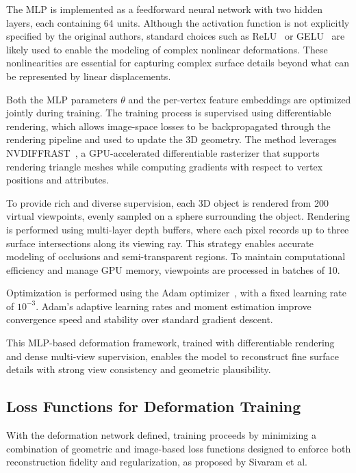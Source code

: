 The MLP is implemented as a feedforward neural network with two hidden layers, each containing 64 units.  
Although the activation function is not explicitly specified by the original authors, standard choices such as ReLU~\cite{nair2010} or GELU~\cite{hendrycks2023} are likely used to enable the modeling of complex nonlinear deformations.  
These nonlinearities are essential for capturing complex surface details beyond what can be represented by linear displacements.

Both the MLP parameters $\theta$ and the per-vertex feature embeddings are optimized jointly during training.  
The training process is supervised using differentiable rendering, which allows image-space losses to be backpropagated through the rendering pipeline and used to update the 3D geometry.  
The method leverages \textsc{NVDIFFRAST}~\cite{laine2020}, a GPU-accelerated differentiable rasterizer that supports rendering triangle meshes while computing gradients with respect to vertex positions and attributes.

To provide rich and diverse supervision, each 3D object is rendered from 200 virtual viewpoints, evenly sampled on a sphere surrounding the object.  
Rendering is performed using multi-layer depth buffers, where each pixel records up to three surface intersections along its viewing ray.
This strategy enables accurate modeling of occlusions and semi-transparent regions.  
To maintain computational efficiency and manage GPU memory, viewpoints are processed in batches of 10.

Optimization is performed using the Adam optimizer~\cite{kingma2017}, with a fixed learning rate of $10^{-3}$.  
Adam's adaptive learning rates and moment estimation improve convergence speed and stability over standard gradient descent.

This MLP-based deformation framework, trained with differentiable rendering and dense multi-view supervision, enables the model to reconstruct fine surface details with strong view consistency and geometric plausibility.

\subsection{Loss Functions for Deformation Training}

With the deformation network defined, training proceeds by minimizing a combination of geometric and image-based loss functions designed to enforce both reconstruction fidelity and regularization, as proposed by Sivaram et al.

